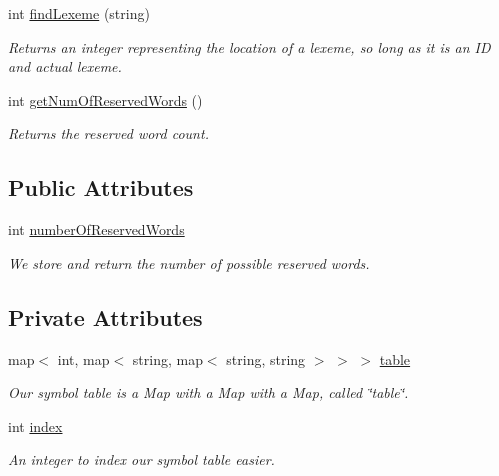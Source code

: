 \begin{DoxyCompactItemize}
int \hyperlink{classSymbolTable_a33fa9fe363246a0b54e9f58191ad931e}{findLexeme} (string)
\begin{DoxyCompactList}\small\item\em Returns an integer representing the location of a lexeme, so long as it is an ID and actual lexeme. \item\end{DoxyCompactList}\item 
int \hyperlink{classSymbolTable_a218f832e3d8b4d37cb3aee7af732a0c6}{getNumOfReservedWords} ()
\begin{DoxyCompactList}\small\item\em Returns the reserved word count. \item\end{DoxyCompactList}\end{DoxyCompactItemize}
\subsection*{Public Attributes}
\begin{DoxyCompactItemize}
\item 
int \hyperlink{classSymbolTable_ac98627cea258b0931be5286aacb1f478}{numberOfReservedWords}
\begin{DoxyCompactList}\small\item\em We store and return the number of possible reserved words. \item\end{DoxyCompactList}\end{DoxyCompactItemize}
\subsection*{Private Attributes}
\begin{DoxyCompactItemize}
\item 
map$<$ int, map$<$ string, map$<$ string, string $>$ $>$ $>$ \hyperlink{classSymbolTable_a96f585bb42df3aad2e833e95681f0727}{table}
\begin{DoxyCompactList}\small\item\em Our symbol table is a Map with a Map with a Map, called \char`\"{}table\char`\"{}. \item\end{DoxyCompactList}\item 
int \hyperlink{classSymbolTable_a6e85689256b178941b87f51e570a6c1e}{index}
\begin{DoxyCompactList}\small\item\em An integer to index our symbol table easier. \item\end{DoxyCompactList}\end{DoxyCompactItemize}


